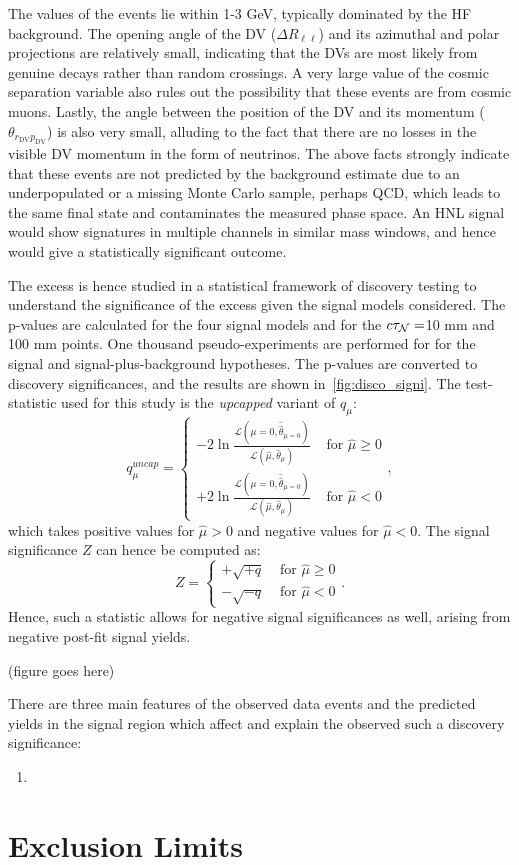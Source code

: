 The \mdv values of the events lie within 1-3 GeV, typically dominated by the HF background. The opening angle of the DV ($\Delta R_{\ell\ell}$) and its azimuthal and polar projections are relatively small, indicating that the DVs are most likely from genuine decays rather than random crossings. A very large value of the cosmic separation variable also rules out the possibility that these events are from cosmic muons. Lastly, the angle between the position of the DV and its momentum ($\theta_{r_\mathrm{DV}p_\mathrm{DV}}$) is also very small, alluding to the fact that there are no losses in the visible DV momentum in the form of neutrinos. The above facts strongly indicate that these events are not predicted by the background estimate due to an underpopulated or a missing Monte Carlo sample, perhaps QCD, which leads to the same final state and contaminates the measured phase space. An HNL signal would show signatures in multiple channels in similar mass windows, and hence would give a statistically significant outcome. 

The excess is hence studied in a statistical framework of discovery testing to understand the significance of the excess given the signal models considered. The p-values are calculated for the four signal models and for the $c\tau_\mathcal{N}=$10 mm and 100 mm points. One thousand pseudo-experiments are performed for for the signal and signal-plus-background hypotheses. The p-values are converted to discovery significances, and the results are shown in~\cref{fig:disco_signi}. The test-statistic used for this study is the \textit{upcapped} variant of $q_{\mu}$:
\begin{equation}
    q_\mu^{uncap} = 
    \begin{cases} 
    -2\ln\frac{\mathcal{L}(\mu=0, \hat{\hat{\theta}}_{\mu=0})}{\mathcal{L}(\hat{\mu}, \hat{\theta}_\mu)} & \text { for } \hat{\mu} \geq 0 \\ 
    +2 \ln \frac{\mathcal{L}(\mu=0, \hat{\hat{\theta}}_{\mu=0})}{\mathcal{L}(\hat{\mu}, \hat{\theta}_\mu)} & \text { for } \hat{\mu}<0
    \end{cases}
    ,
\end{equation}
which takes positive values for $\hat{\mu}>0$ and negative values for $\hat{\mu}<0$. The signal significance $Z$ can hence be computed as:
\begin{equation}
    Z = 
    \begin{cases} 
    +\sqrt{+q} & \text { for } \hat{\mu} \geq 0 \\ 
    -\sqrt{-q} & \text { for } \hat{\mu} < 0
    \end{cases}.
\end{equation}
Hence, such a statistic allows for negative signal significances as well, arising from negative post-fit signal yields.

{\color{red}(figure goes here)}

There are three main features of the observed data events and the predicted yields in the signal region which affect and explain the observed such a discovery significance:
\begin{enumerate}
    \item 
\end{enumerate}

\section{Exclusion Limits}\label{sec:limits}